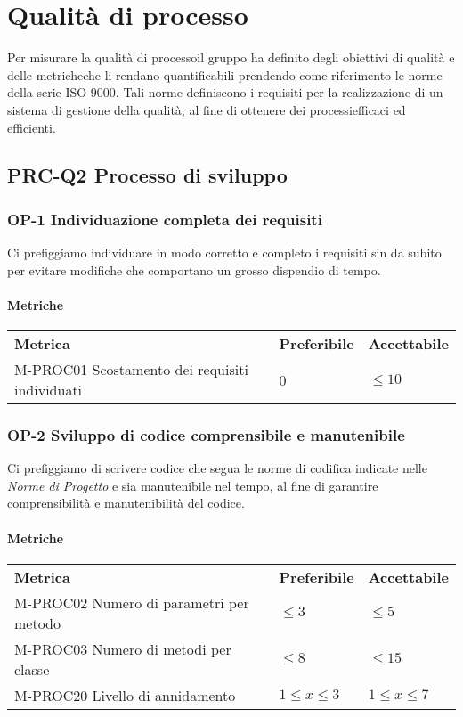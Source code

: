 \section{Qualità di processo}
Per misurare la qualità di processo\glosp il gruppo ha definito degli obiettivi di qualità e delle metriche\glosp che li rendano quantificabili prendendo come riferimento le norme della serie ISO 9000. Tali norme definiscono i requisiti per la realizzazione di un sistema di gestione della qualità, al fine di ottenere dei processi\glosp efficaci ed efficienti.
	\subsection{PRC-Q2 Processo di sviluppo}
		\subsubsection{OP-1 Individuazione completa dei requisiti} 
			Ci prefiggiamo individuare in modo corretto e completo i requisiti sin da subito per evitare modifiche che comportano un grosso dispendio di tempo.
			\paragraph{Metriche} \mbox{}
			\begin{longtable} {
					>{}p{80mm} 
					>{}p{25mm}
					>{}p{25mm}
				}
				\rowcolor{gray!50}
				\textbf{Metrica} & \textbf{Preferibile} & \textbf{Accettabile} \TBstrut \TBstrut \\
				M-PROC01 Scostamento dei requisiti individuati & 0 & $\le 10$ \TBstrut \\ [2mm]
			\end{longtable}
			
		\subsubsection{OP-2 Sviluppo di codice comprensibile e manutenibile}
			Ci prefiggiamo di scrivere codice che segua le norme di codifica indicate nelle \textit{Norme di Progetto} e sia manutenibile nel tempo, al fine di garantire comprensibilità e manutenibilità del codice.
			\paragraph{Metriche} \mbox{}
			\begin{longtable} {
					>{}p{80mm} 
					>{}p{25mm}
					>{}p{25mm}
				}
				\rowcolor{gray!50}
				\textbf{Metrica} & \textbf{Preferibile} & \textbf{Accettabile} \TBstrut \TBstrut \\
				M-PROC02 Numero di parametri per metodo & $ \le 3$ & $ \le 5$ \TBstrut \\ [2mm]
				M-PROC03 Numero di metodi per classe & $ \le 8$ & $ \le 15$ \TBstrut \\ [2mm]
				M-PROC20 Livello di annidamento & $1 \le x \le 3$ & $1 \le x \le 7$ \TBstrut \\ [2mm]
			\end{longtable}
	
